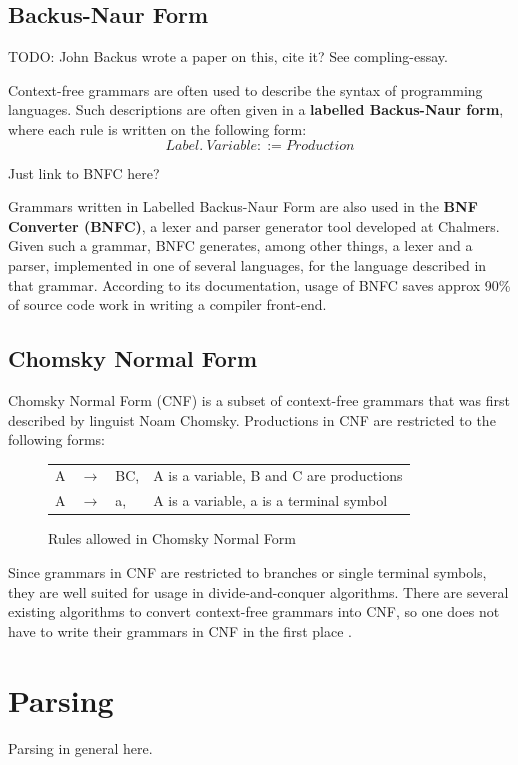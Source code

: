\documentclass[a4paper,12pt,twosided]{report}
\begin{document}
\subsection{Backus-Naur Form}
TODO: John Backus wrote a paper on this, cite it? See compling-essay.

Context-free grammars are often used to describe the syntax of programming
languages. Such descriptions are often given in a \textbf{labelled Backus-Naur
form}, where each rule is written on the following form:
\[
Label.\ Variable ::= Production 
\]

Just link to BNFC here?

Grammars written in Labelled Backus-Naur Form are also used in the \textbf{BNF
Converter (BNFC)}, a lexer and parser generator tool developed at Chalmers.
Given such a grammar, BNFC generates, among other things, a lexer and a parser,
implemented in one of several languages, for the language described in that
grammar. According to its documentation, usage of BNFC saves approx 90\% of
source code work in writing a compiler front-end. 

\subsection{Chomsky Normal Form}
Chomsky Normal Form (CNF) is a subset of context-free grammars that was first
described by linguist Noam Chomsky. Productions in CNF are restricted to the
following forms:

\begin{figure}[H]
\begin{tabular}{l l l l}
    A & $\rightarrow$ & BC, & A is a variable, B and C are productions \\
    A & $\rightarrow$ & a, & A is a variable, a is a terminal symbol \\
\end{tabular}
\caption{Rules allowed in Chomsky Normal Form}
\end{figure}
Since grammars in CNF are restricted to branches or single terminal symbols,
they are well suited for usage in divide-and-conquer algorithms. There are
several existing algorithms to convert context-free grammars into CNF, so one
does not have to write their grammars in CNF in the first place \cite{langeleiss}.

\section{Parsing}
\label{parsingsection}
Parsing in general here.
\end{document}
